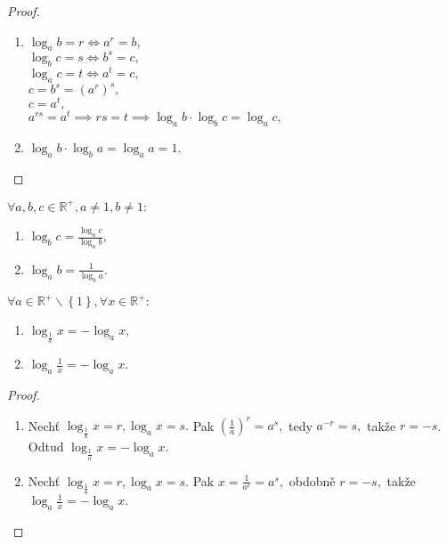 \begin{proof}
    \,
    \begin{enumerate}[$i.$]
        \item
            $\log_a b = r \iff a^r = b,$ \\
            $\log_b c = s \iff b^s = c,$ \\
            $\log_a c = t \iff a^t = c,$ \\
            $c =b^s=\left ( a^r \right )^s,$ \\
            $c = a^t,$ \\
            $a^{rs} = a^t \implies rs = t \implies \log_a b \cdot \log_b c = \log_a c,$
        \item $\log_a b\cdot \log_b a = \log_a a = 1.$\qedhere
    \end{enumerate}
\end{proof}

\begin{veta}
    $\forall a,b,c\in \mathbb R^+, a\ne 1, b\ne 1:$
    \begin{enumerate}[$i.$]
        \item $\log_b c = \frac{\log_a c}{\log_a b},$
       	\item $\log_a b = \frac{1}{\log_b a}.$
    \end{enumerate}
\end{veta}

\begin{veta}
    $\forall a \in \mathbb R^+ \smallsetminus \left \{ 1 \right \}  , \forall x \in \mathbb R^+:$
    \begin{enumerate}[$i.$]
        \item $\log_{\frac{1}{a}} x = -\log_a x,$
       	\item $\log_a \frac{1}{x} = -\log_a x.$
    \end{enumerate}
\end{veta}

\begin{proof}
    \,
    \begin{enumerate}[$i.$]
        \item Nechť $\log_{\frac{1}{a}} x = r, \log_a x = s.$ Pak
        $\left ( \frac{1}{a} \right )^r = a^s,$ tedy $a^{-r}=s,$ takže $r=-s$.
        Odtud $\log_{\frac{1}{a}} x = -\log_a x.$
       	\item Nechť $\log_{\frac{1}{a}} x = r, \log_a x = s.$ Pak
        $x = \frac{1}{a^r}=a^s,$ obdobně $r=-s,$ takže $\log_a \frac{1}{x}=
        -\log_a x.$\qedhere
    \end{enumerate}
\end{proof}

